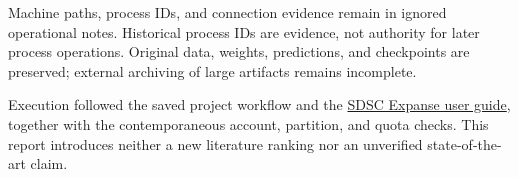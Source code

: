 \documentclass[11pt,a4paper]{article}
\begin{document}
Machine paths, process IDs, and connection evidence remain in ignored operational notes. Historical process IDs are evidence, not authority for later process operations. Original data, weights, predictions, and checkpoints are preserved; external archiving of large artifacts remains incomplete.

Execution followed the saved project workflow and the \href{https://www.sdsc.edu/systems/expanse/user_guide.html}{SDSC Expanse user guide}, together with the contemporaneous account, partition, and quota checks. This report introduces neither a new literature ranking nor an unverified state-of-the-art claim.
\end{document}
